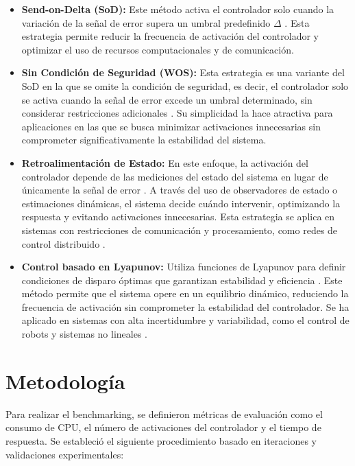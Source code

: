 \documentclass[conference]{IEEEtran}
\begin{document}
\begin{itemize}
    \item \textbf{Send-on-Delta (SoD):} Este m\'etodo activa el controlador solo cuando la variaci\'on de la señal de error supera un umbral predefinido $\Delta$ \cite{Miskowicz2006}. Esta estrategia permite reducir la frecuencia de activaci\'on del controlador y optimizar el uso de recursos computacionales y de comunicaci\'on.
    
    \item \textbf{Sin Condición de Seguridad (WOS):} Esta estrategia es una variante del SoD en la que se omite la condici\'on de seguridad, es decir, el controlador solo se activa cuando la señal de error excede un umbral determinado, sin considerar restricciones adicionales \cite{Durand2018}. Su simplicidad la hace atractiva para aplicaciones en las que se busca minimizar activaciones innecesarias sin comprometer significativamente la estabilidad del sistema.
    
    \item \textbf{Retroalimentación de Estado:} En este enfoque, la activación del controlador depende de las mediciones del estado del sistema en lugar de \'unicamente la señal de error \cite{Lehmann2011}. A trav\'es del uso de observadores de estado o estimaciones din\'amicas, el sistema decide cu\'ando intervenir, optimizando la respuesta y evitando activaciones innecesarias. Esta estrategia se aplica en sistemas con restricciones de comunicaci\'on y procesamiento, como redes de control distribuido \cite{Lunze2010}.
    
    \item \textbf{Control basado en Lyapunov:} Utiliza funciones de Lyapunov para definir condiciones de disparo \'optimas que garantizan estabilidad y eficiencia \cite{Tabuada2007}. Este m\'etodo permite que el sistema opere en un equilibrio din\'amico, reduciendo la frecuencia de activaci\'on sin comprometer la estabilidad del controlador. Se ha aplicado en sistemas con alta incertidumbre y variabilidad, como el control de robots y sistemas no lineales \cite{Heemels2012}.
\end{itemize}

\section{Metodología}
Para realizar el benchmarking, se definieron m\'etricas de evaluaci\'on como el consumo de CPU, el n\'umero de activaciones del controlador y el tiempo de respuesta. Se estableci\'o el siguiente procedimiento basado en iteraciones y validaciones experimentales:
\end{document}
